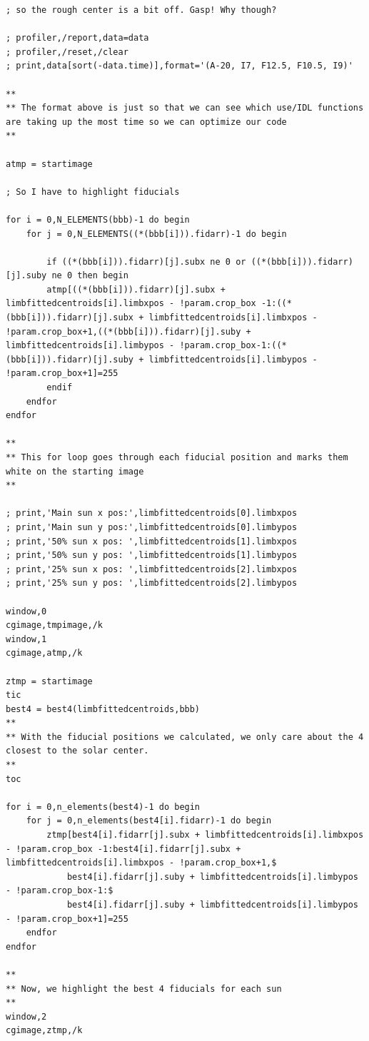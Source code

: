 \documentclass[10pt]{scrartcl}
\begin{document}
\begin{lstlisting}[texcl=false]
; so the rough center is a bit off. Gasp! Why though?

; profiler,/report,data=data
; profiler,/reset,/clear
; print,data[sort(-data.time)],format='(A-20, I7, F12.5, F10.5, I9)'

**
** The format above is just so that we can see which use/IDL functions are taking up the most time so we can optimize our code
**

atmp = startimage

; So I have to highlight fiducials

for i = 0,N_ELEMENTS(bbb)-1 do begin
    for j = 0,N_ELEMENTS((*(bbb[i])).fidarr)-1 do begin

        if ((*(bbb[i])).fidarr)[j].subx ne 0 or ((*(bbb[i])).fidarr)[j].suby ne 0 then begin
        atmp[((*(bbb[i])).fidarr)[j].subx + limbfittedcentroids[i].limbxpos - !param.crop_box -1:((*(bbb[i])).fidarr)[j].subx + limbfittedcentroids[i].limbxpos - !param.crop_box+1,((*(bbb[i])).fidarr)[j].suby + limbfittedcentroids[i].limbypos - !param.crop_box-1:((*(bbb[i])).fidarr)[j].suby + limbfittedcentroids[i].limbypos - !param.crop_box+1]=255
        endif
    endfor
endfor

**
** This for loop goes through each fiducial position and marks them white on the starting image
**

; print,'Main sun x pos:',limbfittedcentroids[0].limbxpos
; print,'Main sun y pos:',limbfittedcentroids[0].limbypos
; print,'50% sun x pos: ',limbfittedcentroids[1].limbxpos
; print,'50% sun y pos: ',limbfittedcentroids[1].limbypos
; print,'25% sun x pos: ',limbfittedcentroids[2].limbxpos
; print,'25% sun y pos: ',limbfittedcentroids[2].limbypos

window,0
cgimage,tmpimage,/k
window,1
cgimage,atmp,/k

ztmp = startimage
tic
best4 = best4(limbfittedcentroids,bbb)
**
** With the fiducial positions we calculated, we only care about the 4 closest to the solar center.
**
toc

for i = 0,n_elements(best4)-1 do begin
    for j = 0,n_elements(best4[i].fidarr)-1 do begin
        ztmp[best4[i].fidarr[j].subx + limbfittedcentroids[i].limbxpos - !param.crop_box -1:best4[i].fidarr[j].subx + limbfittedcentroids[i].limbxpos - !param.crop_box+1,$
            best4[i].fidarr[j].suby + limbfittedcentroids[i].limbypos - !param.crop_box-1:$
            best4[i].fidarr[j].suby + limbfittedcentroids[i].limbypos - !param.crop_box+1]=255
    endfor
endfor

**
** Now, we highlight the best 4 fiducials for each sun 
**
window,2
cgimage,ztmp,/k



\end{lstlisting}
\end{document}
